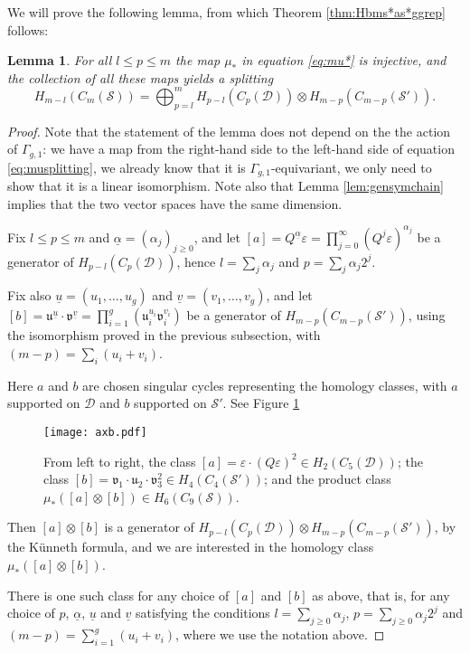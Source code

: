 \documentclass{amsart}
\theoremstyle{plain}
\newtheorem{lem}[thm]   {Lemma}
\theoremstyle{definition}
\newcommand{\D}{\mathcal{D}}
\renewcommand{\S}{\mathcal{S}}
\renewcommand{\u}{\mathfrak{u}}
\renewcommand{\v}{\mathfrak{v}}
\renewcommand{\gg}{\Gamma_{g,1}}
\newcommand{\cms}{C_m(\S)}
\newcommand{\pa}[1]{\left(#1\right)}
\newcommand{\uu}{\underline{u}}
\newcommand{\uv}{\underline{v}}
\newcommand{\ualpha}{\underline{\alpha}}
\renewcommand{\epsilon}{\varepsilon}
\begin{document}
We will prove the following lemma, from which Theorem \ref{thm:Hbms*as*ggrep} follows:
\begin{lem}
 \label{lem:oplussplitting}
For all $l\leq p\leq m$ the map $\mu_*$ in equation \eqref{eq:mu*} is injective, and the collection
of all these maps yields a splitting
\begin{equation}
  \label{eq:musplitting}
 H_{m-l}(\cms)=\bigoplus_{p=l}^m H_{p-l}\pa{C_p(\D)}\otimes H_{m-p}\pa{C_{m-p}(\S')}.
\end{equation}
\end{lem}
\begin{proof}
Note that the statement of the lemma does not depend on the the action of $\gg$:
we have a map from the right-hand side to the left-hand side of equation \eqref{eq:musplitting},
we already know that it is $\gg$-equivariant,
we only need to show that it is a linear isomorphism. Note also that Lemma \ref{lem:gensymchain}
implies that the two vector spaces have the same dimension.

Fix $l\leq p\leq m$ and $\ualpha=(\alpha_j)_{j\geq 0}$, and let $[a]=Q^{\ualpha}\epsilon=\prod_{j=0}^{\infty}(Q^j\epsilon)^{\alpha_j}$ be a generator of
$H_{p-l}(C_p(\D))$, hence $l=\sum_j\alpha_j$ and $p=\sum_j\alpha_j2^j$.

Fix also $\uu=(u_1,\dots, u_g)$ and $\uv=(v_1,\dots,v_g)$,
and let $[b]=\u^{\uu}\cdot\v^{\uv}=\prod_{i=1}^g (\u_i^{u_i}\v_i^{v_i})$ be a generator of $H_{m-p}(C_{m-p}(\S'))$, using the
isomorphism proved in the previous subsection, with $(m-p)=\sum_i(u_i+v_i)$.

Here $a$ and
$b$ are chosen singular cycles representing the homology classes, with $a$ supported on $\D$
and $b$ supported on $\S'$. See Figure \ref{fig:axb}

\begin{figure}[ht]\centering
 \texttt{[image: axb.pdf]}
 \caption{From left to right, the class $[a]=\epsilon\cdot(Q\epsilon)^2\in H_2(C_5(\D))$;
 the class $[b]=\v_1\cdot\u_2\cdot\v_3^2\in H_4(C_4(\S'))$; and the product class
 $\mu_*([a]\otimes[b])\in H_6(C_9(\S))$.}
\label{fig:axb}
\end{figure}

Then $[a]\otimes [b]$ is a generator of $H_{p-l}(C_p(\D))\otimes H_{m-p}(C_{m-p}(\S'))$,
by the K\"unneth formula, and we are interested in the homology class $\mu_*([a]\otimes [b])$.

There is one such
class for any choice of $[a]$ and $[b]$ as above, that is, for any choice of
$p$, $\ualpha$, $\uu$ and $\uv$ satisfying the conditions
$l=\sum_{j\geq 0}\alpha_j$, $p=\sum_{j\geq 0}\alpha_j2^j$ and $(m-p)=\sum_{i=1}^g(u_i+v_i)$, where
we use the notation above.


\end{proof}
\end{document}
